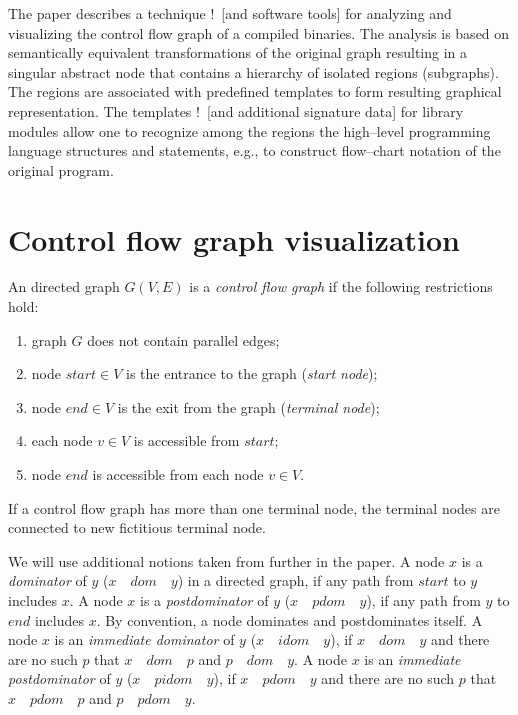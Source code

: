 \documentclass[conference]{IEEEtran}
\newcommand{\nnn}[2][ncolor]{\noindent%
\textcolor{eclr}{!\ [}\textcolor{#1}{#2}\textcolor{eclr}{]}}
\begin{document}
The paper describes a technique \nnn{and software tools} for analyzing and visualizing the control flow graph of a compiled binaries.  The analysis is based on semantically equivalent transformations of the original graph resulting in a singular abstract node that contains a hierarchy of isolated regions (subgraphs).  The regions are associated with predefined templates to form resulting graphical representation.  The templates \nnn{and additional signature data} for library modules allow one to recognize among the regions the high--level programming language structures and statements, e.g., to construct flow--chart notation of the original program.

\section{Control flow graph visualization}

An directed graph $G(V,E)$ is a \emph{control flow graph} if the following restrictions hold:
\begin{enumerate}
\item graph $G$ does not contain parallel edges;
\item node $start\in V$ is the entrance to the graph (\emph{start node});
\item node $end \in V$ is the exit from the graph (\emph{terminal node});
\item each node $v \in V$ is accessible from $start$;
\item node $end$ is accessible from each node $v \in V$.
\end{enumerate}
If a control flow graph has more than one terminal node, the terminal nodes are connected to new fictitious terminal node.

We will use additional notions taken from \cite{sese} further in the paper.  A node $x$ is a \emph{dominator} of $y$ ($x\quad dom\quad y$) in a directed graph, if any path from $start$ to $y$ includes $x$.  A node $x$ is a \emph{postdominator} of $y$ ($x\quad pdom\quad y$), if any path from $y$ to $end$ includes $x$.  By convention, a node dominates and postdominates itself.  A node $x$ is an \emph{immediate dominator} of $y$ ($x\quad idom\quad y$), if $x\quad dom\quad y$ and there are no such $p$ that $x\quad dom\quad p$ and $p\quad dom\quad y$.  A node $x$ is an \emph{immediate postdominator} of $y$ ($x\quad pidom\quad y$), if $x\quad pdom\quad y$ and there are no such $p$ that $x\quad pdom\quad p$ and $p\quad pdom\quad y$.
\end{document}
